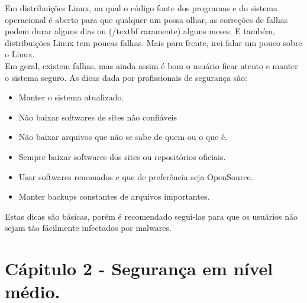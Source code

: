 \documentclass[12pt, letterpaper]{report}
\begin{document}
	Em distribuições Linux, na qual o código fonte dos programas e do sistema operacional é aberto para que qualquer um possa olhar, as correções de falhas podem durar alguns dias ou ({/textbf raramente}) alguns meses. E também, distribuições Linux tem poucas falhas. Mais para frente, irei falar um pouco sobre o Linux.\\

	Em geral, existem falhas, mas ainda assim é bom o usuário ficar atento e manter o sistema seguro. As dicas dada por profissionais de segurança são:

	\begin{itemize} %
		\item Manter o sistema atualizado.
		\item Não baixar softwares de sites não confiáveis
		\item Não baixar arquivos que não se sabe de quem ou o que é.
		\item Sempre baixar softwares dos sites ou repositórios oficiais.
		\item Usar softwares renomados e que de preferência seja OpenSource.
		\item Manter backups constantes de arquivos importantes.
	\end{itemize} %

	Estas dicas são básicas, porém é recomendado segui-las para que os usuários não sejam tão fácilmente infectados por malwares.

\pagebreak

\chapter{Cápitulo 2 - Segurança em nível médio.}
\end{document}
